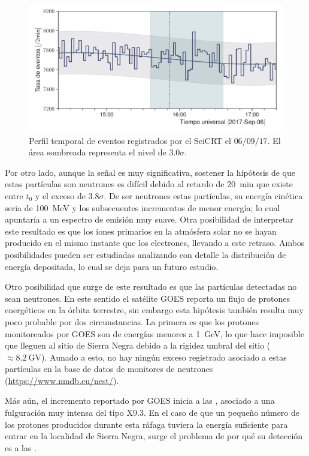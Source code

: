 \begin{figure}
        \centering
        \includegraphics[width=\textwidth]{neutron-170906.pdf}
        \caption{Perfil temporal de eventos registrados por el SciCRT el $06/09/17$. El área sombreada representa el nivel de $3.0\sigma$.}
        \label{fig:september-06-neutrons}
\end{figure}

Por otro lado, aunque la señal es muy significativa, sostener la hipótesis de que estas partículas son neutrones es difícil debido al retardo de \SI{20}{\minute} que existe entre $t_{0}$ y el exceso de $3.8\sigma$. De ser neutrones estas partículas, su energía cinética seria de \SI{100}{\mega\electronvolt} y los subsecuentes incrementos de menor energía; lo cual apuntaría a un espectro de emisión muy suave. Otra posibilidad de interpretar este resultado es que los iones primarios en la atmósfera solar no se hayan producido en el mismo instante que los electrones, llevando a este retraso. Ambos posibilidades pueden ser estudiadas analizando con detalle la distribución de energía depositada, lo cual se deja para un futuro estudio.

Otro posibilidad que surge de este resultado es que las partículas detectadas no sean neutrones. En este sentido el satélite GOES reporta un flujo de protones energéticos en la órbita terrestre, sin embargo esta hipótesis también resulta muy poco probable por dos circunstancias. La primera es que los protones monitoreados por GOES son de energías menores a \SI{1}{\giga\electronvolt}, lo que hace imposible que lleguen al sitio de Sierra Negra debido a la rigidez umbral del sitio ($\approx\SI{8.2}{\giga\volt}$). Aunado a esto, no hay ningún exceso registrado asociado a estas partículas en la base de datos de monitores de neutrones (\url{https://www.nmdb.eu/nest/}).

Más aún, el incremento reportado por GOES inicia a las , asociado a una fulguración muy intensa del tipo X\num{9.3}. En el caso de que un pequeño número de los protones producidos durante esta ráfaga tuviera la energía suficiente para entrar en la localidad de Sierra Negra, surge el problema de por qué su detección es a las .

